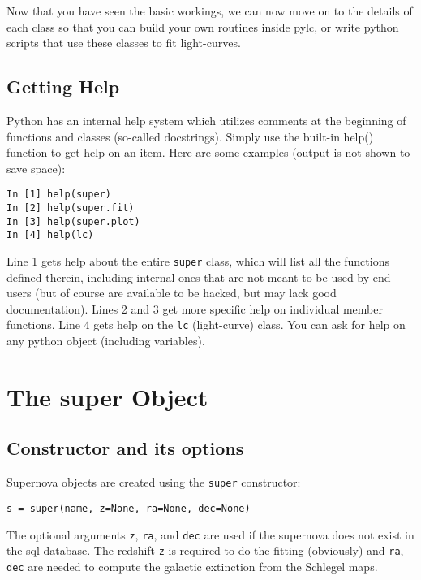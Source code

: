 \documentclass[12pt]{article}
\begin{document}
Now that you have seen the basic workings, we can now move on to the
details of each class so that you can build your own routines inside
pylc, or write python scripts that use these classes to fit light-curves. 


\subsection{Getting Help}

Python has an internal help system which utilizes comments at the
beginning of functions and classes (so-called docstrings). Simply
use the built-in help() function to get help on an item. Here are
some examples (output is not shown to save space):

\begin{verbatim}
In [1] help(super)
In [2] help(super.fit)
In [3] help(super.plot)
In [4] help(lc)
\end{verbatim}

Line 1 gets help about the entire \texttt{super} class, which will
list all the functions defined therein, including internal ones that
are not meant to be used by end users (but of course are available
to be hacked, but may lack good documentation). Lines 2 and 3 get
more specific help on individual member functions. Line 4 gets help
on the \texttt{lc} (light-curve) class. You can ask for help on any
python object (including variables).


\section{The super Object\label{sec:The-super-Object}}


\subsection{Constructor and its options}

Supernova objects are created using the \texttt{super} constructor:

 \begin{verbatim}
s = super(name, z=None, ra=None, dec=None)
\end{verbatim}

The optional arguments \texttt{z}, \texttt{ra}, and \texttt{dec} are
used if the supernova does not exist in the sql database. The redshift
\texttt{z} is required to do the fitting (obviously) and \texttt{ra},
\texttt{dec} are needed to compute the galactic extinction from the
Schlegel maps.
\end{document}
